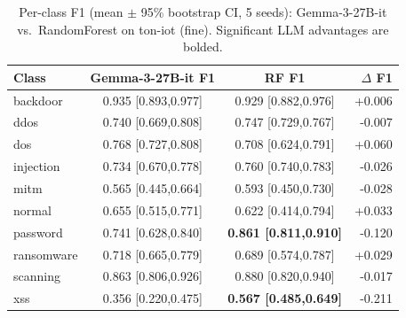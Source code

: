 \begin{table}[t]
\caption{Per-class F1 (mean $\pm$ 95\% bootstrap CI, 5 seeds): Gemma-3-27B-it vs.\ RandomForest on ton-iot (fine). Significant LLM advantages are bolded.}
\label{t:r2_perclass}
\begin{tabular}{lccr}
\hline
Class & Gemma-3-27B-it F1 & RF F1 & $\Delta$ F1 \\
\hline
backdoor & 0.935 [0.893,0.977] & 0.929 [0.882,0.976] & +0.006 \\
ddos & 0.740 [0.669,0.808] & 0.747 [0.729,0.767] & -0.007 \\
dos & 0.768 [0.727,0.808] & 0.708 [0.624,0.791] & +0.060 \\
injection & 0.734 [0.670,0.778] & 0.760 [0.740,0.783] & -0.026 \\
mitm & 0.565 [0.445,0.664] & 0.593 [0.450,0.730] & -0.028 \\
normal & 0.655 [0.515,0.771] & 0.622 [0.414,0.794] & +0.033 \\
password & 0.741 [0.628,0.840] & \textbf{0.861 [0.811,0.910]} & -0.120 \\
ransomware & 0.718 [0.665,0.779] & 0.689 [0.574,0.787] & +0.029 \\
scanning & 0.863 [0.806,0.926] & 0.880 [0.820,0.940] & -0.017 \\
xss & 0.356 [0.220,0.475] & \textbf{0.567 [0.485,0.649]} & -0.211 \\
\hline
\end{tabular}
\end{table}